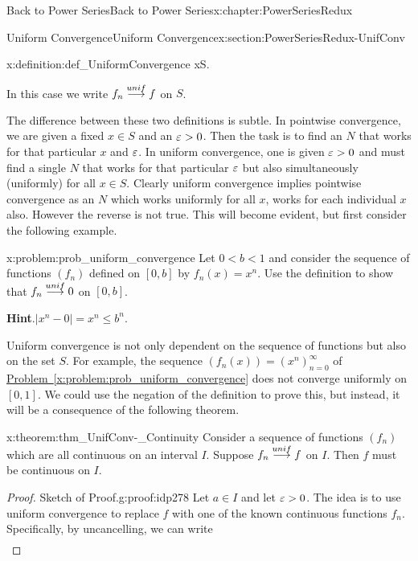 \begin{chapterptx}{Back to Power Series}{}{Back to Power Series}{}{}{x:chapter:PowerSeriesRedux}
\begin{sectionptx}{Uniform Convergence}{}{Uniform Convergence}{}{}{x:section:PowerSeriesRedux-UnifConv}
\begin{definition}{}{x:definition:def_UniformConvergence}
			x\in S\).%
			\par
			In this case we write \(f_n\stackrel{unif}{\longrightarrow} f\) on \(S\).%
		\end{definition}
		The difference between these two definitions is subtle. In pointwise convergence, we are given a fixed \(x\in S\) and an \(\varepsilon>0\). Then the task is to find an \(N\) that works for that particular \(x\) and \(\varepsilon\). In uniform convergence, one is given \(\varepsilon>0\) and must find a single \(N\) that works for that particular \(\varepsilon\) but also simultaneously (uniformly) for all \(x\in S\). Clearly uniform convergence implies pointwise convergence as an \(N\) which works uniformly for all \(x\), works for each individual \(x\) also. However the reverse is not true. This will become evident, but first consider the following example.%
		\begin{problem}{}{x:problem:prob_uniform_convergence}%
			Let \(0\lt b\lt 1\) and consider the sequence of functions \(\left(f_n\right)\) defined on \([0,b]\) by \(f_n(x)=x^n\). Use the definition to show that \(f_n\stackrel{unif}{\longrightarrow} 0\) on \([0,b]\).%
			\par\smallskip%
			\noindent\textbf{\blocktitlefont Hint}.\hypertarget{g:hint:idp277}{}\quad{}\(|x^n-0|=x^n\leq b^n\).%
		\end{problem}
		Uniform convergence is not only dependent on the sequence of functions but also on the set \(S\). For example, the sequence \(\left(f_n(x)\right)=\left(x^n\right)_{n=0}^\infty\) of \hyperref[x:problem:prob_uniform_convergence]{Problem~{\xreffont\ref{x:problem:prob_uniform_convergence}}} does not converge uniformly on \([0,1]\). We could use the negation of the definition to prove this, but instead, it will be a consequence of the following theorem.%
		\begin{theorem}{}{}{x:theorem:thm_UnifConv-_Continuity}%
			 Consider a sequence of functions \(\left(f_n\right)\) which are all continuous on an interval \(I\). Suppose \(f_n\stackrel{unif}{\longrightarrow} f\) on \(I\). Then \(f\) must be continuous on \(I\).%
		\end{theorem}
		\begin{proof}{Sketch of Proof.}{g:proof:idp278}
			Let \(a\in I\) and let \(\varepsilon>0\). The idea is to use uniform convergence to replace \(f\) with one of the known continuous functions \(f_n\). Specifically, by uncancelling, we can write%
			\begin{align*}

\end{align*}
\end{proof}
\end{sectionptx}
\end{chapterptx}
